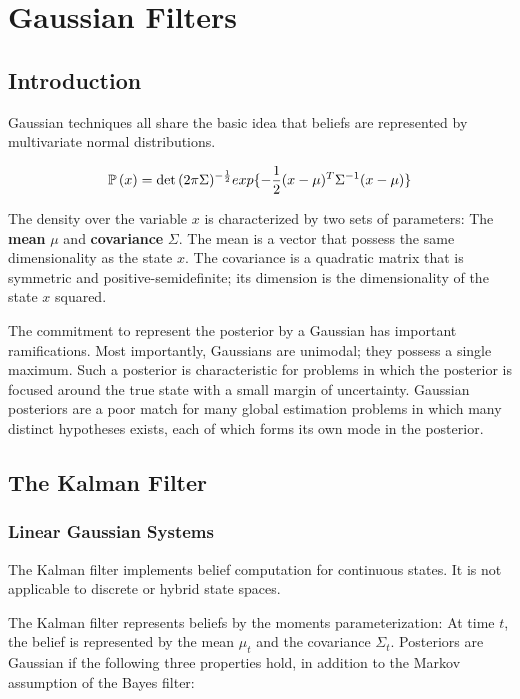 \section{Gaussian Filters}

\subsection{Introduction}

Gaussian techniques all share the basic idea that beliefs are represented by multivariate normal distributions.

\begin{equation}
  \mathbb{P}\left(x\right) = \det{(2\pi\Sigma)^{-\frac{1}{2}}} exp{\{-\frac{1}{2}(x-\mu)^{T}\Sigma^{-1}(x-\mu})\}
\end{equation}

The density over the variable $x$ is characterized by two sets of parameters: The \textbf{mean} $\mu$ and \textbf{covariance} $\Sigma$.
The mean is a vector that possess the same dimensionality as the state $x$.
The covariance is a quadratic matrix that is symmetric and positive-semidefinite; its dimension is the dimensionality of the state $x$ squared.

\vspace{2mm}

The commitment to represent the posterior by a Gaussian has important ramifications.
Most importantly, Gaussians are unimodal; they possess a single maximum.
Such a posterior is characteristic for problems in which the posterior is focused around the true state with a small margin of uncertainty.
Gaussian posteriors are a poor match for many global estimation problems in which many distinct hypotheses exists, each of which forms its own mode in the posterior.


\subsection{The Kalman Filter}

\subsubsection{Linear Gaussian Systems}

The Kalman filter implements belief computation for continuous states.
It is not applicable to discrete or hybrid state spaces.

The Kalman filter represents beliefs by the moments parameterization: At time $t$, the belief is represented by the mean $\mu_t$ and the covariance $\Sigma_t$.
Posteriors are Gaussian if the following three properties hold, in addition to the Markov assumption of the Bayes filter:

